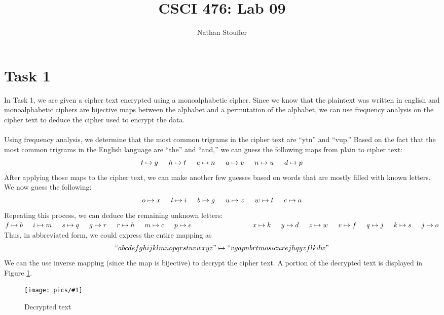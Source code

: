 \documentclass[11pt]{article}
\newcommand{\fig}[2]{ 
\begin{figure}[h]
	\centering
	\caption{#2}
	\texttt{[image: pics/\#1]}
	\label{fig:#1}
\end{figure} 
}
\begin{document}
\title{CSCI 476: Lab 09}
\author{Nathan Stouffer}
\maketitle
\newpage

\newpage
\section*{Task 1}

In Task 1, we are given a cipher text encrypted using a monoalphabetic cipher. Since we know that the plaintext was written in english and monoalphabetic ciphers are bijective maps between the alphabet and a permutation of the alphabet, we can use frequency analysis on the cipher text to deduce the cipher used to encrypt the data. \\\\
Using frequency analysis, we determine that the most common trigrams in the cipher text are ``ytn'' and ``vup.'' Based on the fact that the most common trigrams in the English language are ``the'' and ``and,'' we can guess the following maps from plain to cipher text:
$$  t \mapsto y \indent 
	h \mapsto t \indent
	e \mapsto n \indent
	a \mapsto v \indent 
	n \mapsto u \indent
	d \mapsto p $$
After applying those maps to the cipher text, we can make another few guesses based on words that are mostly filled with known letters. We now guess the following:
$$  o \mapsto x \indent l \mapsto i \indent
	b \mapsto g \indent u \mapsto z \indent
	w \mapsto l \indent c \mapsto a $$
Repeating this process, we can deduce the remaining unknown letters: \\ 
\indent \indent \indent \indent \indent \indent
$   f \mapsto b \indent i \mapsto m \indent
	s \mapsto q \indent g \mapsto r \indent
	r \mapsto h \indent m \mapsto c \indent
	p \mapsto e \newline \indent \indent \indent \indent \indent \indent
	x \mapsto k \indent y \mapsto d \indent 
	z \mapsto w \indent v \mapsto f \indent 
	q \mapsto j \indent k \mapsto s \indent 
	j \mapsto o $ \\
Thus, in abbreviated form, we could express the entire mapping as
$$ ``abcdefghijklmnopqrstuvwxyz" \mapsto ``vgapnbrtmosicuxejhqyzflkdw" $$
We can the use inverse mapping (since the map is bijective) to decrypt the cipher text. A portion of the decrypted text is displayed in Figure \ref{fig:task1.1}.

\fig{task1.1}{Decrypted text}

\newpage
\end{document}
